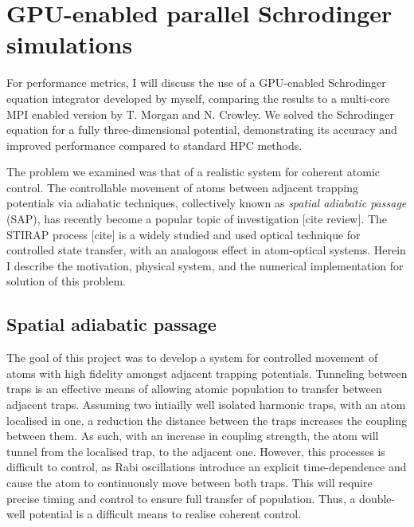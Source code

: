 \section{GPU-enabled parallel Schrodinger simulations}
\label{sec:3D Stirap parallel Schrodinger simulations}
For performance metrics, I will discuss the use of a GPU-enabled Schrodinger equation integrator developed by myself, comparing the results to a multi-core MPI enabled version by T. Morgan and N. Crowley. We solved the Schrodinger equation for a fully three-dimensional potential, demonstrating its accuracy and improved performance compared to standard HPC methods.

The problem we examined was that of a realistic system for coherent atomic control. The controllable movement of atoms between adjacent trapping potentials via adiabatic techniques, collectively known as \textit{spatial adiabatic passage} (SAP), has recently become a popular topic of investigation [cite review]. The STIRAP process [cite] is a widely studied and used optical technique for controlled state transfer, with an analogous effect in atom-optical systems. Herein I describe the motivation, physical system, and the numerical implementation for solution of this problem.


\subsection{Spatial adiabatic passage}
The goal of this project was to develop a system for controlled movement of atoms with high fidelity amongst adjacent trapping potentials. Tunneling between traps is an effective means of allowing atomic population to transfer between adjacent traps. Assuming two intiailly well isolated harmonic traps, with an atom localised in one, a reduction the distance between the traps increases the coupling between them. As such, with an increase in coupling strength, the atom will tunnel from the localised trap, to the adjacent one. However, this processes is difficult to control, as Rabi oscillations introduce an explicit time-dependence and cause the atom to continuously move between both traps. This will require precise timing and control to ensure full transfer of population. Thus, a double-well potential is a difficult means to realise coherent control.

